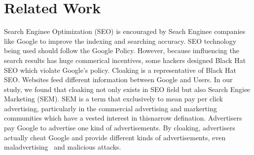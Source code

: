 \section{Related Work}
\label{s:related-work}


Search Enginee Optimization (SEO) is encouraged by Seach Enginee companies like Google to improve the indexing and searching accuracy. SEO technology being used should follow the Google Policy. However, because imfluencing the search results has huge commerical incentives, some hackers designed Black Hat SEO which violate Google's policy. Cloaking is a representative of Black Hat SEO. Websites feed different information between Google and Users. In our study, we found that cloaking not only exists in SEO field but also Search Engiee Marketing (SEM). SEM is a term that exclusively to mean pay per click advertising, particularly in the commercial advertising and markerting communities which have a vested interest in thisnarrow defination. Advertisers pay Google to advertise one kind of advertisements. By cloaking, advertisers actually cheat Google and provide different kinds of advertisements, even maladvertising~\cite{Li:2012:KYE:2382196.2382267} and malicious attacks. 

